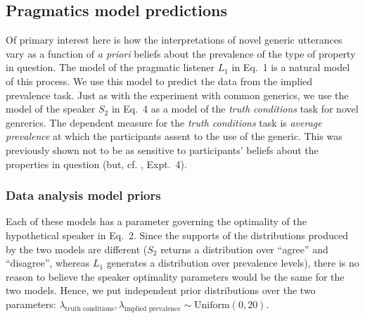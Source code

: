 \documentclass[10pt,letterpaper]{article}
\newcommand{\red}[1]{\textcolor{Red}{#1}}
\begin{document}

\subsection{Pragmatics model predictions}


Of primary interest here is how the interpretations of novel generic utterances vary as a function of \emph{a priori} beliefs about the prevalence of the type of property in question.
The model of the pragmatic listener $L_1$ in Eq.~1 is a natural model of this process.
We use this model to predict the data from the implied prevalence task.
Just as with the experiment with common generics, we use the model of the speaker $S_2$ in Eq.~4 as a model of the \emph{truth conditions} task for novel genrerics.
The dependent measure for the \emph{truth conditions} task is \emph{average prevalence} at which the participants assent to the use of the generic. 
This was previously shown not to be as sensitive to participants' beliefs about the properties in question (but, cf. , Expt.~4).

\subsubsection{Data analysis model priors}


Each of these models has a parameter governing the optimality of the hypothetical speaker in Eq.~2. 
Since the supports of the distributions produced by the two models are different ($S_2$ returns a distribution over ``agree'' and ``disagree'', whereas $L_1$ generates a distribution over prevalence levels), there is no reason to believe the speaker optimality parameters would be the same for the two models. 
Hence, we put independent prior distributions over the two parameters: $\lambda_{\text{truth conditions}}, \lambda_{\text{implied prevalence}} \sim \text{Uniform}(0, 20)$.
\end{document}
